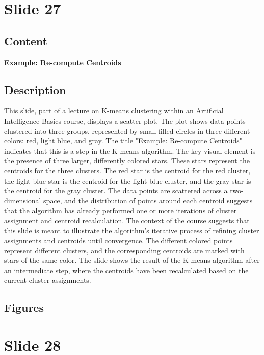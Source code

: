 \documentclass{article}%
\begin{document}
%
\newpage%
\section{Slide 27}%
\label{sec:Slide27}%
\subsection{Content}%

\textbf{Example: Re-compute Centroids}
%
\subsection{Description}%
This slide, part of a lecture on K-means clustering within an Artificial Intelligence Basics course, displays a scatter plot.  The plot shows data points clustered into three groups, represented by small filled circles in three different colors:  red, light blue, and gray.  The title "Example: Re-compute Centroids" indicates that this is a step in the K-means algorithm.  The key visual element is the presence of three larger, differently colored stars. These stars represent the centroids for the three clusters.  The red star is the centroid for the red cluster, the light blue star is the centroid for the light blue cluster, and the gray star is the centroid for the gray cluster.  The data points are scattered across a two-dimensional space, and the distribution of points around each centroid suggests that the algorithm has already performed one or more iterations of cluster assignment and centroid recalculation.  The context of the course suggests that this slide is meant to illustrate the algorithm's iterative process of refining cluster assignments and centroids until convergence.  The different colored points represent different clusters, and the corresponding centroids are marked with stars of the same color.  The slide shows the result of the K-means algorithm after an intermediate step, where the centroids have been recalculated based on the current cluster assignments.%
\subsection{Figures}%
\begin{figure}[H]%
\centering%
\end{figure}

%
\newpage%
\section{Slide 28}%
\label{sec:Slide28}%
\end{document}
